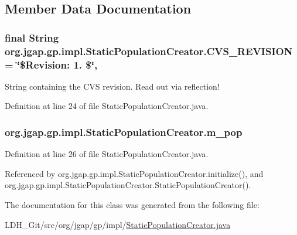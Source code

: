 \subsection{Member Data Documentation}
\hypertarget{classorg_1_1jgap_1_1gp_1_1impl_1_1_static_population_creator_ad04d9cc2baafe4dffdbc82065a75b8be}{
\subsubsection[{C\-V\-S\-\_\-\-R\-E\-V\-I\-S\-I\-O\-N}]{\setlength{\rightskip}{0pt plus 5cm}final String org.\-jgap.\-gp.\-impl.\-Static\-Population\-Creator.\-C\-V\-S\-\_\-\-R\-E\-V\-I\-S\-I\-O\-N = \char`\"{}\$Revision\-: 1. \$\char`\"{}\hspace{0.3cm}{\ttfamily [static]}, {\ttfamily [private]}}}\label{classorg_1_1jgap_1_1gp_1_1impl_1_1_static_population_creator_ad04d9cc2baafe4dffdbc82065a75b8be}
String containing the C\-V\-S revision. Read out via reflection! 

Definition at line 24 of file Static\-Population\-Creator.\-java.

\hypertarget{classorg_1_1jgap_1_1gp_1_1impl_1_1_static_population_creator_a974a3a9f0228282dfce6842fc416ce25}{
\subsubsection[{m\-\_\-pop}]{ org.\-jgap.\-gp.\-impl.\-Static\-Population\-Creator.\-m\-\_\-pop\hspace{0.3cm}{\ttfamily [private]}}}\label{classorg_1_1jgap_1_1gp_1_1impl_1_1_static_population_creator_a974a3a9f0228282dfce6842fc416ce25}


Definition at line 26 of file Static\-Population\-Creator.\-java.



Referenced by org.\-jgap.\-gp.\-impl.\-Static\-Population\-Creator.\-initialize(), and org.\-jgap.\-gp.\-impl.\-Static\-Population\-Creator.\-Static\-Population\-Creator().



The documentation for this class was generated from the following file\-:\begin{DoxyCompactItemize}
\item 
L\-D\-H\-\_\-\-Git/src/org/jgap/gp/impl/\hyperlink{_static_population_creator_8java}{Static\-Population\-Creator.\-java}\end{DoxyCompactItemize}

